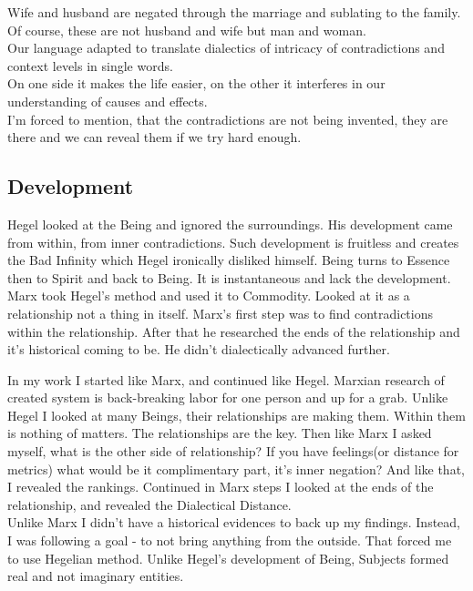 \documentclass[12pt, a4paper, twocolumn]{article}
\begin{document}
\begin{appendices}
Wife and husband are negated through the marriage and sublating to the family.
\\ Of course, these are not husband and wife but man and woman.
\\ Our language adapted to translate dialectics of intricacy of contradictions and context levels in single words.
\\ On one side it makes the life easier, on the other it interferes in our understanding of causes and effects.
\\ I'm forced to mention, that the contradictions are not being invented, they are there and we can reveal them if we try hard enough.

\subsection{Development}

Hegel looked at the Being and ignored the surroundings. His development came from within, from inner contradictions.
Such development is fruitless and creates the Bad Infinity which Hegel ironically disliked himself. Being turns to Essence then to Spirit and back to Being. It is instantaneous and lack the development.
\\ Marx took Hegel's method and used it to Commodity. Looked at it as a relationship not a thing in itself. 
Marx's first step was to find contradictions within the relationship. After that he researched the ends of the relationship and it's historical coming to be.
He didn't dialectically advanced further.

In my work I started like Marx, and continued like Hegel. Marxian research of created system is back-breaking labor for one person and up for a grab.
Unlike Hegel I looked at many Beings, their relationships are making them. Within them is nothing of matters.
The relationships are the key. Then like Marx I asked myself, what is the other side of relationship?
If you have feelings(or distance for metrics) what would be it complimentary part, it's inner negation?
And like that, I revealed the rankings. Continued in Marx steps I looked at the ends of the relationship, and revealed the Dialectical Distance.
\\ Unlike Marx I didn't have a historical evidences to back up my findings. Instead, I was following a goal - to not bring anything from the outside.
That forced me to use Hegelian method. Unlike Hegel's development of Being, Subjects formed real and not imaginary entities.


\end{appendices}
\end{document}
